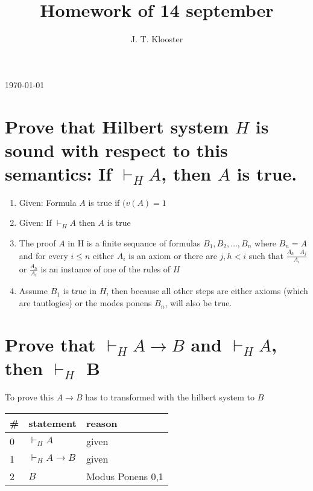 \documentclass{article}
\begin{document}
\author{J. T. Klooster}
\title{Homework of 14 september}
\maketitle
\today
\section{Prove that Hilbert system $H$ is sound with respect to this
semantics: If $\vdash_H A$, then $A$ is true.}
\begin{enumerate}
	\item Given: Formula $A$ is true if $(v(A) = 1$
	\item Given: If $\vdash_H A$ then $A$ is true 
	\item The proof $A$ in H is a finite sequance of formulas $B_1, B_2,
		\dots, B_n$ where $B_n = A$ and for every $i \le n$ either $A_i$ is
		an axiom or there are $j,h < i$ such that $\frac{A_h \quad A_j}{A_i}
		$ or $\frac{A_h}{A_i}$ is an instance of one of the rules of $H$
	\item Assume $B_1$ is true in $H$, then because all other steps
		are either axioms (which are tautlogies) or the modes ponens
		$B_n$, will also be true.

\end{enumerate}


\section{Prove that $\vdash_H A \to B$ and $\vdash_H A$, then $\vdash_H$ B}
To prove this $A \to B$ has to transformed with the hilbert system to $B$

\begin{tabular}{@{}l|ll@{}}
\#& statement			&reason \\ \toprule
0& $\vdash_H A$ & given \\
1& $\vdash_H A \to B$ & given \\
2& $B$ & Modus Ponens 0,1 \\
\end{tabular}
\end{document}
